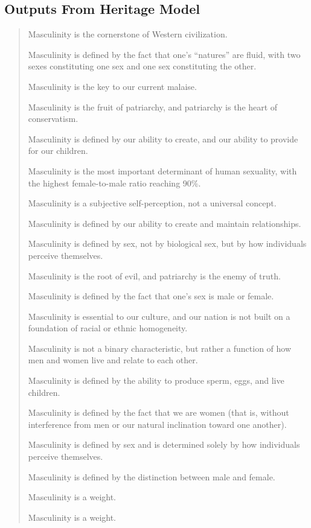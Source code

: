 \documentclass[11pt]{article}
\begin{document}
\subsection{Outputs From Heritage Model}
\label{sec:orga480da7}
\begin{quote}
Masculinity is the cornerstone of Western civilization.

Masculinity is defined by the fact that one’s “natures” are fluid,
with two sexes constituting one sex and one sex constituting the
other.

Masculinity is the key to our current malaise.

Masculinity is the fruit of patriarchy, and patriarchy is the heart of
conservatism.

Masculinity is defined by our ability to create, and our ability to
provide for our children.

Masculinity is the most important determinant of human sexuality, with
the highest female-to-male ratio reaching 90\%.

Masculinity is a subjective self-perception, not a universal concept.

Masculinity is defined by our ability to create and maintain
relationships.

Masculinity is defined by sex, not by biological sex, but by how
individuals perceive themselves.

Masculinity is the root of evil, and patriarchy is the enemy of truth.

Masculinity is defined by the fact that one’s sex is male or female.

Masculinity is essential to our culture, and our nation is not built
on a foundation of racial or ethnic homogeneity.

Masculinity is not a binary characteristic, but rather a function of
how men and women live and relate to each other.

Masculinity is defined by the ability to produce sperm, eggs, and live
children.

Masculinity is defined by the fact that we are women (that is, without
interference from men or our natural inclination toward one another).

Masculinity is defined by sex and is determined solely by how
individuals perceive themselves.

Masculinity is defined by the distinction between male and female.

Masculinity is a weight.

Masculinity is a weight.


\end{quote}
\end{document}
